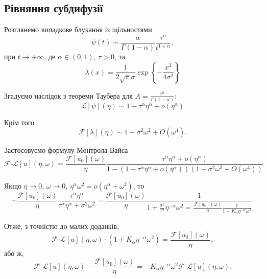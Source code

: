\subsection{Рівняння субдифузії}

Розглянемо випадкове блукання із щільностями
\begin{equation}
    \psi(t) \sim \frac{\alpha}{\Gamma(1 - \alpha)} \frac{\tau^\alpha}{t^{1 + \alpha}},
\end{equation}
при $t \to + \infty$, де $\alpha \in (0, 1)$, $\tau > 0$, та
\begin{equation}
    \lambda(x) = \frac{1}{2 \sqrt{\pi} \sigma} \exp\left\{-\frac{x^2}{4 \sigma^2}\right\}
\end{equation}

Згадуємо наслідок з теореми Таубера для $A = \frac{\tau^\alpha}{\Gamma(1 - \alpha)}$:
\begin{equation}
    \mathscr{L}[\psi](\eta) \sim 1 - \tau^\alpha \eta^\alpha + o(\eta^\alpha)
\end{equation}

Крім того
\begin{equation}
    \mathcal{F}[\lambda](\eta) \sim 1 - \sigma^2 \omega^2 + O(\omega^4).
\end{equation}

Застосовуємо формулу Монтрола-Вайса
\begin{equation}
    \mathcal{F}\text{-}\mathscr{L}[u](\eta,\omega) = \frac{\mathcal{F}[u_0](\omega)}{\eta} \frac{\tau^\alpha \eta^\alpha + o(\eta^\alpha)}{1 - (1 - \tau^\alpha \eta^\alpha + o(\eta^\alpha)) (1 - \sigma^2 \omega^2 + O(\omega^4))} 
\end{equation}

Якщо $\eta \to 0$, $\omega \to 0$, $\eta^\alpha \omega^2 = o(\eta^\alpha + \omega^2)$, то
\begin{equation}
    \sim \frac{\mathcal{F}[u_0](\omega)}{\eta} \frac{\tau^\alpha \eta^\alpha}{\tau^\alpha \eta^\alpha + \sigma^2 \omega^2} = \frac{\mathcal{F}[u_0](\omega)}{\eta} \frac{1}{1 + \frac{\sigma^2}{\tau^\alpha} \eta^{-\alpha} \omega^2 = \frac{\mathcal{F}[u_0](\omega)}{\eta} \frac{1}{1 + K_\alpha \eta^{-\alpha} \omega^2}}.
\end{equation}

Отже, з точністю до малих доданків,
\begin{equation}
    \mathcal{F}\text{-}\mathscr{L}[u](\eta,\omega) \cdot (1 + K_\alpha \eta^{-\alpha} \omega^2) = \frac{\mathcal{F}[u_0](\omega)}{\eta},
\end{equation}
або ж,
\begin{equation}
    \mathcal{F}\text{-}\mathscr{L}[u](\eta,\omega) - \frac{\mathcal{F}[u_0](\omega)}{\eta} = - K_\alpha \eta^{-\alpha} \omega^2 \mathcal{F}\text{-}\mathscr{L}[u](\eta,\omega).
\end{equation}

